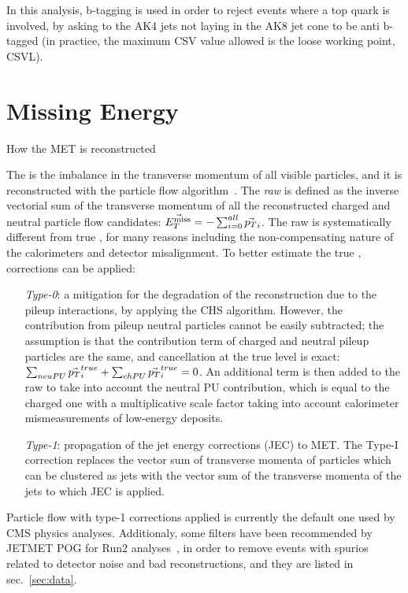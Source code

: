 In this analysis, b-tagging is used in order to reject events where a top quark is involved, by asking to the AK4 jets not laying in the AK8 jet cone to be anti b-tagged (in practice, the maximum CSV value allowed is the loose working point, CSVL).

\section{Missing Energy}
{\color{red} How the MET is reconstructed}
 
The \MET is the imbalance in the transverse momentum of all visible particles, and it is reconstructed with the particle flow algorithm~\cite{bib:PF1}. The \emph{raw} \MET is defined as the inverse vectorial sum of the transverse momentum of all the reconstructed charged and neutral particle flow candidates: $\vec{E_T^{\text{miss}}}= - \sum_{i=0}^{all} \vec{p_T}_i$.
The raw \MET is systematically different from true \MET, for many reasons including the non-compensating nature of the calorimeters and detector misalignment. To better estimate the true \MET, corrections can be applied:
\begin{itemize}
   \item[\emph{Type-0}:] a mitigation for the degradation of the \MET reconstruction due to the pileup interactions, by applying the CHS algorithm. However, the \MET contribution from pileup neutral particles cannot be easily subtracted; the assumption is that the \MET contribution term of charged and neutral pileup particles are the same, and cancellation at the true level is exact: $\sum_{neuPU} \vec{p_T}_i^{true} + \sum_{chPU} \vec{p_T}_i^{true} = 0$. An additional \MET term is then added to the raw \MET to take into account the neutral PU contribution, which is equal to the charged one with a multiplicative scale factor taking into account calorimeter mismeasurements of low-\pt energy deposits.
   \item[\emph{Type-1}:] propagation of the jet energy corrections (JEC) to MET. The Type-I correction replaces the vector sum of transverse momenta of particles which can be clustered as jets with the vector sum of the transverse momenta of the jets to which JEC is applied. 
 \end{itemize}
% 
Particle flow \MET with type-1 corrections applied is currently the default one used by CMS physics analyses. Additionaly, some \MET filters have been recommended by JETMET POG for Run2 analyses~\cite{JetMETPOG}, in order to remove events with spurios \MET related to detector noise and bad reconstructions, and they are listed in sec.~\ref{sec:data}.
